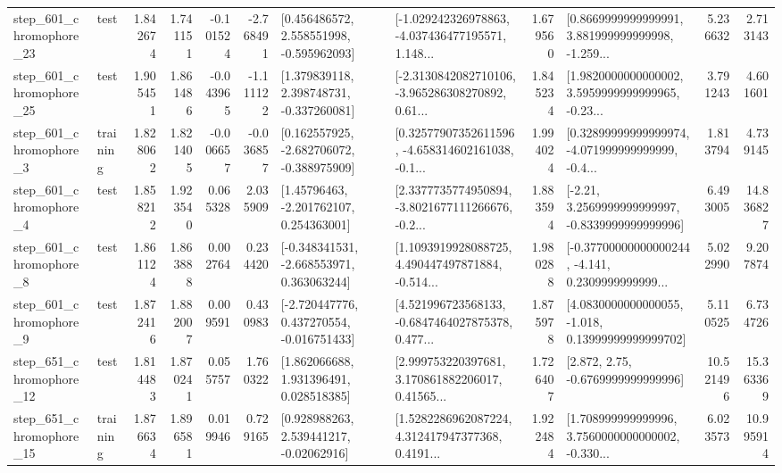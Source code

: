 \begin{tabular}{llrrrrllrlrr}
  step\_601\_chromophore\_23 &      test &      1.842674 &    1.741151 &     -0.101524 & -2.768491 &    [0.456486572, 2.558551998, -0.595962093] &  [-1.029242326978863, -4.037436477195571, 1.148... &       1.679560 &  [0.8669999999999991, 3.881999999999998, -1.259... &            5.236632 &          2.713143 \\
  step\_601\_chromophore\_25 &      test &      1.905451 &    1.861486 &     -0.043965 & -1.111122 &    [1.379839118, 2.398748731, -0.337260081] &  [-2.3130842082710106, -3.965286308270892, 0.61... &       1.845234 &  [1.9820000000000002, 3.5959999999999965, -0.23... &            3.791243 &          4.601601 \\
   step\_601\_chromophore\_3 &  training &      1.828062 &    1.821405 &     -0.006657 & -0.036857 &   [0.162557925, -2.682706072, -0.388975909] &  [0.32577907352611596, -4.658314602161038, -0.1... &       1.994024 &  [0.32899999999999974, -4.071999999999999, -0.4... &            1.813794 &          4.739145 \\
   step\_601\_chromophore\_4 &      test &      1.858212 &    1.923540 &      0.065328 &  2.035909 &     [1.45796463, -2.201762107, 0.254363001] &  [2.3377735774950894, -3.8021677111266676, -0.2... &       1.883594 &   [-2.21, 3.2569999999999997, -0.8339999999999996] &            6.493005 &         14.836827 \\
   step\_601\_chromophore\_8 &      test &      1.861124 &    1.863888 &      0.002764 &  0.234420 &   [-0.348341531, -2.668553971, 0.363063244] &  [1.1093919928088725, 4.490447497871884, -0.514... &       1.980288 &  [-0.37700000000000244, -4.141, 0.2309999999999... &            5.022990 &          9.207874 \\
   step\_601\_chromophore\_9 &      test &      1.872416 &    1.882007 &      0.009591 &  0.430983 &   [-2.720447776, 0.437270554, -0.016751433] &  [4.521996723568133, -0.6847464027875378, 0.477... &       1.875978 &  [4.0830000000000055, -1.018, 0.13999999999999702] &            5.110525 &          6.734726 \\
  step\_651\_chromophore\_12 &      test &      1.814483 &    1.870241 &      0.055757 &  1.760322 &     [1.862066688, 1.931396491, 0.028518385] &  [2.999753220397681, 3.170861882206017, 0.41565... &       1.726407 &                 [2.872, 2.75, -0.6769999999999996] &           10.521496 &         15.363369 \\
  step\_651\_chromophore\_15 &  training &      1.876634 &    1.896581 &      0.019946 &  0.729165 &     [0.928988263, 2.539441217, -0.02062916] &  [1.5282286962087224, 4.312417947377368, 0.4191... &       1.922484 &  [1.708999999999996, 3.7560000000000002, -0.330... &            6.023573 &         10.995914 \\

\end{tabular}
